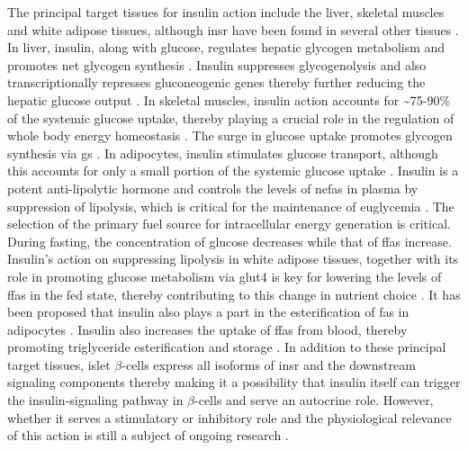 
The principal target tissues for insulin action include the liver, skeletal muscles and white adipose tissues, although \gls{insr} have been found in several other tissues \textbf{\cite{spencer_identification_2018}}. In liver, insulin, along with glucose, regulates hepatic glycogen metabolism and promotes net glycogen synthesis \textbf{\cite{petersen_mechanisms_2018,rossetti_relative_1990,roden_roles_1996}}. Insulin suppresses glycogenolysis and also transcriptionally represses gluconeogenic genes thereby further reducing the hepatic glucose output \textbf{\cite{petersen_mechanisms_2018,claus_regulation_1976,cherrington_direct_1998,edgerton_insulins_2006}}. In skeletal muscles, insulin action accounts for \textasciitilde75-90\% of the systemic glucose uptake, thereby playing a crucial role in the regulation of whole body energy homeostasis \textbf{\cite{leto_regulation_2012,petersen_mechanisms_2018}}. The surge in glucose uptake promotes glycogen synthesis via \gls{gs} \textbf{\cite{sylow_many_2021}}. In adipocytes, insulin stimulates glucose transport, although this accounts for only a small portion of the systemic glucose uptake \textbf{\cite{leto_regulation_2012}}. Insulin is a potent anti-lipolytic hormone and controls the levels of \glspl{nefa} in plasma by suppression of lipolysis, which is critical for the maintenance of euglycemia \textbf{\cite{dimitriadis_glucose_2006}}. The selection of the primary fuel source for intracellular energy generation is critical. During fasting, the concentration of glucose decreases while that of \glspl{ffa} increase. Insulin's action on suppressing lipolysis in white adipose tissues, together with its role in promoting glucose metabolism via \gls{glut}4 is key for lowering the levels of \glspl{ffa} in the fed state, thereby contributing to this change in nutrient choice \textbf{\cite{hummel_free_2021}}. It has been proposed that insulin also plays a part in the esterification of \glspl{fa} in adipocytes \textbf{\cite{lewis_disordered_2002}}. Insulin also increases the uptake of \glspl{ffa} from blood, thereby promoting triglyceride esterification and storage \textbf{\cite{czech_insulin_2013}}. %
In addition to these principal target tissues, islet $\beta$-cells express all isoforms of \gls{insr} and the downstream signaling components thereby making it a possibility that insulin itself can trigger the insulin-signaling pathway in $\beta$-cells and serve an autocrine role. However, whether it serves a stimulatory or inhibitory role and the physiological relevance of this action is still a subject of ongoing research \textbf{\cite{rhodes_direct_2013,rachdaoui_insulin_2020}}.\\

